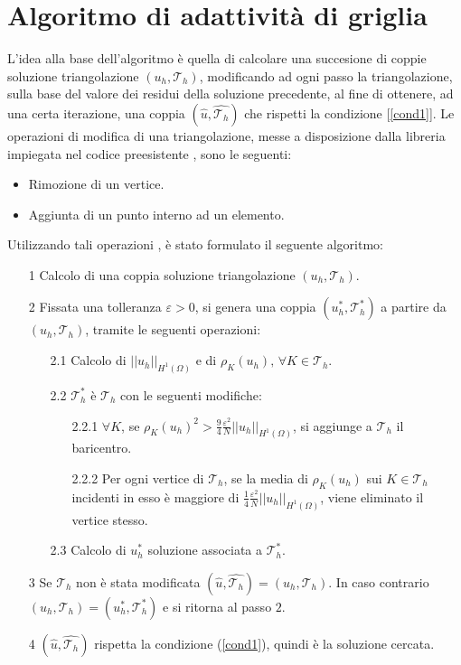 \documentclass[a4paper,10pt,twoside]{amsart}
\theoremstyle{remark}
\theoremstyle{definition}
\renewcommand{\epsilon}{\varepsilon}
\begin{document}
\section{Algoritmo di adattività di griglia}
L'idea alla base dell'algoritmo è quella di calcolare una succesione di coppie soluzione triangolazione $(u_h, \mathcal{T}_h)$, modificando ad ogni passo la triangolazione, sulla base del valore dei residui della soluzione precedente, al fine di ottenere, ad una certa iterazione, una coppia $(\hat{u},\hat{\mathcal{T}_h})$ che rispetti la condizione [\ref{cond1}]. Le operazioni di modifica di una triangolazione, messe a disposizione dalla libreria \cite{CGAL} impiegata nel codice preesistente \cite{FePe}, sono le seguenti:
\begin{itemize}
\item Rimozione di un vertice.
\item Aggiunta di un punto interno ad un elemento.
\end{itemize}
Utilizzando tali operazioni , è stato formulato il seguente algoritmo:
\begin{itemize}
\item[1] Calcolo di una coppia soluzione triangolazione $(u_h, \mathcal{T}_h)$.
\item[2] Fissata una tolleranza $\epsilon > 0$, si genera una coppia $(u_h^{*}, \mathcal{T}_h^{*})$ a partire da $(u_h, \mathcal{T}_h)$, tramite le seguenti operazioni:
      \begin{itemize}
      \item[2.1] Calcolo di $||u_h||_{H^1 (\Omega)}$ e di $\rho_K(u_h), \, \forall K \in \mathcal{T}_h$.
      \item[2.2] $\mathcal{T}_h^{*}$ è $\mathcal{T}_h$ con le seguenti modifiche:
		\begin{itemize}
		\item[2.2.1] $\forall K$, se ${\rho_K(u_h)}^2 > \frac{9}{4} \frac{\epsilon^2}{N} ||u_h||_{H^1 (\Omega)}$, si aggiunge a $\mathcal{T}_h$ il baricentro.
		\item[2.2.2] Per ogni vertice di $\mathcal{T}_h$, se la media di $\rho_K(u_h)$ sui $K \in \mathcal{T}_h$ incidenti in esso è maggiore di $\frac{1}{4}\frac{\epsilon^2}{N}||u_h||_{H^1 (\Omega)}$, viene eliminato il vertice stesso.
		\end{itemize}
      \item[2.3] Calcolo di $u_h^{*}$ soluzione associata a $\mathcal{T}_h^{*}$.
      \end{itemize}
\item[3] Se $\mathcal{T}_h$ non è stata modificata $(\hat{u},\hat{\mathcal{T}_h})=(u_h,\mathcal{T}_h)$. In caso contrario $(u_h,\mathcal{T}_h)=(u_h^{*},\mathcal{T}_h^{*})$ e si ritorna al passo $2$.
\item[4] $(\hat{u},\hat{\mathcal{T}_h})$ rispetta la condizione (\ref{cond1}), quindi è la soluzione cercata. 
\end{itemize}
\end{document}
